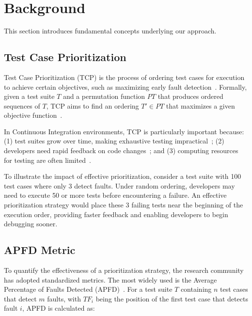 \documentclass[10pt,journal,compsoc]{IEEEtran}
\begin{document}
\section{Background}
\label{sec:background}

This section introduces fundamental concepts underlying our approach.

\subsection{Test Case Prioritization}
\label{sec:bg_tcp}

Test Case Prioritization (TCP) is the process of ordering test cases for execution
to achieve certain objectives, such as maximizing early fault detection~\cite{rothermel2001prioritizing}.
Formally, given a test suite $T$ and a permutation function $PT$ that produces
ordered sequences of $T$, TCP aims to find an ordering $T' \in PT$ that
maximizes a given objective function~\cite{elbaum2002test}.

In Continuous Integration environments, TCP is particularly important because:
(1) test suites grow over time, making exhaustive testing impractical~\cite{memon2017taming};
(2) developers need rapid feedback on code changes~\cite{hilton2016usage}; and
(3) computing resources for testing are often limited~\cite{spieker2017reinforcement}.

To illustrate the impact of effective prioritization, consider a test suite with
100 test cases where only 3 detect faults. Under random ordering, developers may
need to execute 50 or more tests before encountering a failure. An effective
prioritization strategy would place these 3 failing tests near the beginning of
the execution order, providing faster feedback and enabling developers to begin
debugging sooner.

\subsection{APFD Metric}
\label{sec:bg_apfd}

To quantify the effectiveness of a prioritization strategy, the research
community has adopted standardized metrics. The most widely used is the
Average Percentage of Faults Detected (APFD)~\cite{rothermel1999test}. For a test suite $T$
containing $n$ test cases that detect $m$ faults, with $TF_i$ being the position
of the first test case that detects fault $i$, APFD is calculated as:
\end{document}
